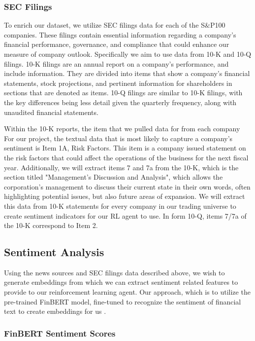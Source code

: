 \subsubsection{SEC Filings}\label{filings}

To enrich our dataset, we utilize SEC filings data for each of the S$\&$P100 companies. 
These filings contain essential information regarding a company's financial 
performance, governance, and compliance that could enhance our measure of 
company outlook. Specifically we aim to use data from 10-K and 10-Q filings. 
10-K filings are an annual report on a company’s performance, and include information. 
They are divided into items that show a company’s financial statements, 
stock projections, and pertinent information for shareholders in sections that 
are denoted as items. 10-Q filings are similar to 10-K filings, with the key differences being less detail given the quarterly frequency, along with unaudited financial statements.


Within the 10-K reports, the item that we pulled data for from each company  For our project, the textual data that is most likely to capture a company’s sentiment is Item 1A, Risk Factors. This item is a company issued statement on the risk factors that could affect the operations of the  business for the next fiscal year. Additionally, we will extract items 7 and 7a from the 10-K, which is the section titled "Management's Discussion and Analysis", which allows the corporation's management to discuss their current state in their own words, often highlighting potential issues, but also future areas of expansion. We will extract this data from 10-K statements for every company in our trading universe to create sentiment indicators for our RL agent to use. In form 10-Q, items 7/7a of the 10-K correspond to Item 2.\\


\subsection{Sentiment Analysis}

Using the news sources and SEC filings data described above, we wish to 
generate embeddings from which we can extract sentiment related features 
to provide to our reinforcement learning agent. Our approach, which is to utilize the pre-trained 
FinBERT model, fine-tuned to recognize the sentiment of financial text to 
create embeddings for us \cite{finbert}. 

\subsubsection{FinBERT Sentiment Scores}\label{finbert}

